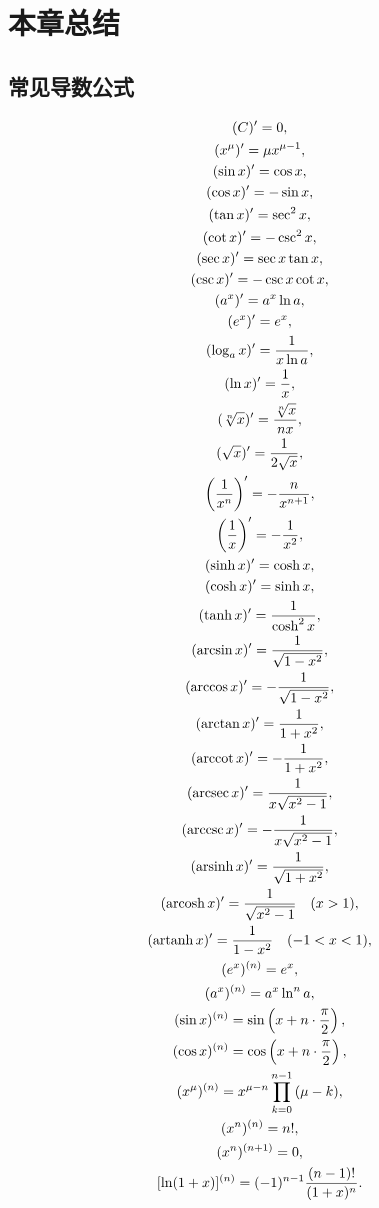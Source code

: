\section{本章总结}
\subsection{常见导数公式}
\begin{gather*}
	(C)' = 0, \\
	(x^\mu)' = \mu x^{\mu-1}, \\
	(\sin x)' = \cos x, \\
	(\cos x)' = - \sin x, \\
	(\tan x)' = \sec^2 x, \\
	(\cot x)' = - \csc^2 x, \\
	(\sec x)' = \sec x \tan x, \\
	(\csc x)' = - \csc x \cot x, \\
	(a^x)' = a^x \ln a, \\
	(e^x)' = e^x, \\
	(\log_a x)' = \frac{1}{x \ln a}, \\
	(\ln x)' = \frac{1}{x}, \\
	(\sqrt[n]{x})' = \frac{\sqrt[n]{x}}{n x}, \\
	(\sqrt{x})' = \frac{1}{2\sqrt{x}}, \\
	\left(\frac{1}{x^n}\right)' = -\frac{n}{x^{n+1}}, \\
	\left(\frac{1}{x}\right)' = -\frac{1}{x^2}, \\
	(\sinh x)' = \cosh x, \\
	(\cosh x)' = \sinh x, \\
	(\tanh x)' = \frac{1}{\cosh^2 x}, \\
	(\arcsin x)' = \frac{1}{\sqrt{1 - x^2}}, \\
	(\arccos x)' = - \frac{1}{\sqrt{1 - x^2}}, \\
	(\arctan x)' = \frac{1}{1 + x^2}, \\
	(\arccot x)' = - \frac{1}{1 + x^2}, \\
	(\arcsec x)' = \frac{1}{x \sqrt{x^2-1}}, \\
	(\arccsc x)' = -\frac{1}{x \sqrt{x^2-1}}, \\
	(\arsinh x)' = \frac{1}{\sqrt{1 + x^2}}, \\
	(\arcosh x)' = \frac{1}{\sqrt{x^2 - 1}} \quad (x > 1), \\
	(\artanh x)' = \frac{1}{1 - x^2} \quad (-1 < x < 1), \\
	(e^x)^{(n)} = e^x, \\
	(a^x)^{(n)} = a^x \ln^n a, \\
	(\sin x)^{(n)} = \sin \left( x + n \cdot \frac{\pi}{2} \right), \\
	(\cos x)^{(n)} = \cos \left( x + n \cdot \frac{\pi}{2} \right), \\
	(x^\mu)^{(n)} = x^{\mu-n}\prod_{k=0}^{n-1} {(\mu - k)}, \\
	(x^n)^{(n)} = n!, \\
	(x^n)^{(n+1)} = 0, \\
	[\ln(1+x)]^{(n)} = (-1)^{n-1} \frac{(n-1)!}{(1+x)^n}.
\end{gather*}
